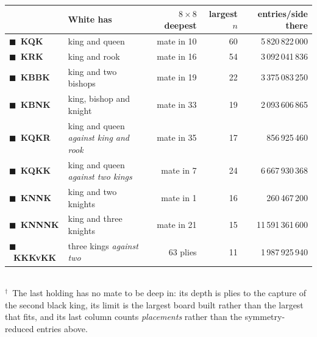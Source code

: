 \documentclass[10pt]{article}
\begin{document}
\begin{center}\small
\begin{tabular}{@{}llrrr@{}}
\toprule
& \textbf{White has} & \textbf{$8\times8$ deepest} & \textbf{largest $n$} & \textbf{entries/side there} \\
\midrule
{\color{kqk}$\blacksquare$}~\textbf{KQK}  & king and queen            & mate in 10 & 60 & 5\,820\,822\,000 \\
{\color{krk}$\blacksquare$}~\textbf{KRK}  & king and rook             & mate in 16 & 54 & 3\,092\,041\,836 \\
{\color{kbbk}$\blacksquare$}~\textbf{KBBK}& king and two bishops      & mate in 19 & 22 & 3\,375\,083\,250 \\
{\color{kbnk}$\blacksquare$}~\textbf{KBNK}& king, bishop and knight   & mate in 33 & 19 & 2\,093\,606\,865 \\
\midrule
{\color{kqkr}$\blacksquare$}~\textbf{KQKR}& king and queen \emph{against king and rook}
                                                                      & mate in 35 & 17 & \phantom{0}856\,925\,460 \\
{\color{kqkk}$\blacksquare$}~\textbf{KQKK}& king and queen \emph{against two kings}
                                                                      & mate in \phantom{0}7 & 24 & 6\,667\,930\,368 \\
\midrule
{\color{knnk}$\blacksquare$}~\textbf{KNNK} & king and two knights     & mate in \phantom{0}1 & 16 & \phantom{00}260\,467\,200 \\
{\color{knnnk}$\blacksquare$}~\textbf{KNNNK}& king and three knights  & mate in 21 & 15 & 11\,591\,361\,600 \\
\midrule
{\color{kings}$\blacksquare$}~\textbf{KKKvKK}& three kings \emph{against two} & 63 plies\rlap{$^{\dagger}$} & 11 & 1\,987\,925\,940\rlap{$^{\dagger}$} \\
\bottomrule
\end{tabular}\\[1mm]
{\scriptsize\color{inksoft}$^{\dagger}$~The last holding has no mate to be deep in:
its depth is plies to the capture of the second black king, its limit is the
largest board built rather than the largest that fits, and its last column
counts \emph{placements} rather than the symmetry-reduced entries above.}
\end{center}
\end{document}
